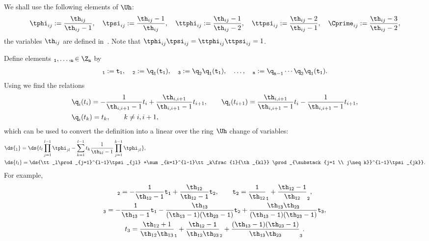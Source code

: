We shall use the following elements of $\Uh$:
\begin{gather*}  \tphi_{ij}:=\frac{\th_{ij}}{\th_{ij}-1}  ,\quad \tpsi_{ij}:=\frac{\th_{ij}-1}{\th_{ij}} ,
\quad \ttphi_{ij}:=\frac{\th_{ij}-1}{\th_{ij}-2} ,\quad \ttpsi_{ij}:=\frac{\th_{ij}-2}{\th_{ij}-1} ,\quad \Cprime_{ij}:=\frac{\th_{ij}-3}{\th_{ij}-2},
\end{gather*}
the variables $\th_{ij}$ are def\/ined in~. Note that $\tphi_{ij}\tpsi_{ij}=\ttphi_{ij}\ttpsi_{ij}=1$.


Def\/ine  elements $\tt_1,\ldots, \tt_n\in\Z_n$ by
\begin{gather*}
\label{3.1}
\tt_1:=t_1 ,\quad\tt_2:=\q_{1}(t_1) ,\quad\tt_3:=\q_{2}\q_{1}(t_1) ,
\quad\ldots, \quad \tt_n:=\q_{n-1}\cdots \q_{2}\q_{1}(t_1)  .
\end{gather*}
Using  we f\/ind the relations
 \begin{gather}
 \begin{split}
& \q_i(t_i)  =-\frac{1}{\th_{i,i+1}-1}t_i+\frac{\th_{i,i+1}}{\th_{i,i+1}-1}t_{i+1}  ,
\qquad \q_i(t_{i+1})= \frac{\th_{i,i+1}}{\th_{i,i+1}-1}t_i-\frac{1}{\th_{i,i+1}-1}t_{i+1} ,\\ %
& \q_i(t_k) =  t_k ,\qquad k\not=i,i+1  ,
 \end{split}\label{acwot}
 \end{gather}
which can be used to convert the def\/inition  into  a linear over the ring $\Uh$ change of variables:
\begin{gather}
\begin{split}
& \ds{\tt_l} =\ds{t_l\prod_{j=1}^{l-1}\tphi_{jl}
-\sum_{k=1}^{l-1}t_k\frac{1}{\th_{kl}-1}\prod_{j=1}^{k-1}\tphi_{jl}}  , \\
& \ds{t_l} =\ds{\tt_l\prod_{j=1}^{l-1}\tpsi_{jl} +\sum_{k=1}^{l-1}\tt_k\frac{1}{\th_{kl}}
\prod_{\substack{j=1 \\ j\neq k}}^{l-1}\tpsi_{jk}} .
\end{split} \label{3.1a}
\end{gather}
For example,
\begin{gather*}
\tt_2 =-\frac{1}{\th_{12}-1}t_1+\frac{\th_{12}}{\th_{12}-1}t_2 ,\qquad
t_2=\frac{1}{\th_{12}}\tt_1+\frac{\th_{12}-1}{\th_{12}}\tt_2 ,\\
\tt_3 =-\frac{1}{\th_{13}-1}t_1-\frac{\th_{13}}{(\th_{13}-1)(\th_{23}-1)}t_2+
\frac{\th_{13}\th_{23}}{(\th_{13}-1)(\th_{23}-1)}t_3  ,\\
t_3 =  \frac{\th_{12}+1}{\th_{12}\th_{13}}\tt_1+\frac{\th_{12}-1}{\th_{12}\th_{23}}\tt_2+
\frac{(\th_{13}-1)(\th_{23}-1)}{\th_{13}\th_{23}}\tt_3  .
\end{gather*}


